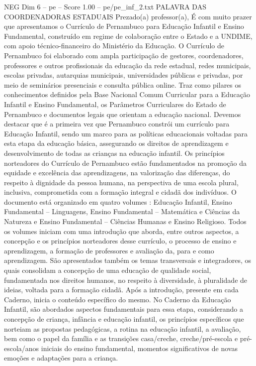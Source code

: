 \begin{textsample}{NEG Dim 6 – pe – Score 1.00 – pe/pe\_inf\_2.txt}  \label{ex:f6_neg_036}
PALAVRA DAS COORDENADORAS ESTADUAIS Prezado(a) professor(a), É com muito prazer que apresentamos o Currículo de Pernambuco para Educação Infantil e Ensino Fundamental, construído em regime de colaboração entre o Estado e a UNDIME, com apoio técnico-financeiro do Ministério da Educação.
O Currículo de Pernambuco foi elaborado com ampla participação de gestores, coordenadores, professores e outros profissionais da educação da rede estadual, redes municipais, escolas privadas, autarquias municipais, universidades públicas e privadas, por meio de seminários presenciais e consulta pública online.
Traz como pilares os conhecimentos definidos pela Base Nacional Comum Curricular para a Educação Infantil e Ensino Fundamental, os Parâmetros Curriculares do Estado de Pernambuco e documentos legais que orientam a educação nacional.
Devemos destacar que é a primeira vez que Pernambuco constrói um currículo para Educação Infantil, sendo um marco para as políticas educacionais voltadas para esta etapa da educação básica, assegurando os direitos de aprendizagem e desenvolvimento de todas as crianças na educação infantil.
Os princípios norteadores do Currículo de Pernambuco estão fundamentados na promoção da equidade e excelência das aprendizagens, na valorização das diferenças, do respeito à dignidade da pessoa humana, na perspectiva de uma escola plural, inclusiva, comprometida com a formação integral e cidadã dos indivíduos.
O documento está organizado em quatro volumes : Educação Infantil, Ensino Fundamental – Linguagens, Ensino Fundamental – Matemática e Ciências da Natureza e Ensino Fundamental – Ciências Humanas e Ensino Religioso.
Todos os volumes iniciam com uma introdução que aborda, entre outros aspectos, a concepção e os princípios norteadores desse currículo, o processo de ensino e aprendizagem, a formação de professores e avaliação da, para e como aprendizagem.
São apresentados também os temas transversais e integradores, os quais consolidam a concepção de uma educação de qualidade social, fundamentada nos direitos humanos, no respeito à diversidade, à pluralidade de ideias, voltada para a formação cidadã.
Após a introdução, presente em cada Caderno, inicia o conteúdo específico do mesmo.
No Caderno da Educação Infantil, são abordados aspectos fundamentais para essa etapa, considerando a concepção de criança, infância e educação infantil, os princípios específicos que norteiam as propostas pedagógicas, a rotina na educação infantil, a avaliação, bem como o papel da família e as transições casa/creche, creche/pré-escola e pré-escola/anos iniciais do ensino fundamental, momentos significativos de novas emoções e adaptações para a criança.

\end{textsample}
